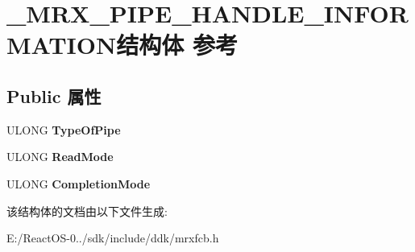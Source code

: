\hypertarget{struct___m_r_x___p_i_p_e___h_a_n_d_l_e___i_n_f_o_r_m_a_t_i_o_n}{}\section{\+\_\+\+M\+R\+X\+\_\+\+P\+I\+P\+E\+\_\+\+H\+A\+N\+D\+L\+E\+\_\+\+I\+N\+F\+O\+R\+M\+A\+T\+I\+O\+N结构体 参考}
\label{struct___m_r_x___p_i_p_e___h_a_n_d_l_e___i_n_f_o_r_m_a_t_i_o_n}
\subsection*{Public 属性}
\begin{DoxyCompactItemize}
\item 
\mbox{\label{struct___m_r_x___p_i_p_e___h_a_n_d_l_e___i_n_f_o_r_m_a_t_i_o_n_a110eb03b5eba73bcc7aa93b13a556359}} 
U\+L\+O\+NG {\bfseries Type\+Of\+Pipe}
\item 
\mbox{\label{struct___m_r_x___p_i_p_e___h_a_n_d_l_e___i_n_f_o_r_m_a_t_i_o_n_ab1c3b391f9c28745f93eff57fd18115e}} 
U\+L\+O\+NG {\bfseries Read\+Mode}
\item 
\mbox{\label{struct___m_r_x___p_i_p_e___h_a_n_d_l_e___i_n_f_o_r_m_a_t_i_o_n_ac8287cddb1c8bddf0a12f11c0ea5ae21}} 
U\+L\+O\+NG {\bfseries Completion\+Mode}
\end{DoxyCompactItemize}


该结构体的文档由以下文件生成\+:\begin{DoxyCompactItemize}
\item 
E\+:/\+React\+O\+S-\/0../sdk/include/ddk/mrxfcb.\+h\end{DoxyCompactItemize}
